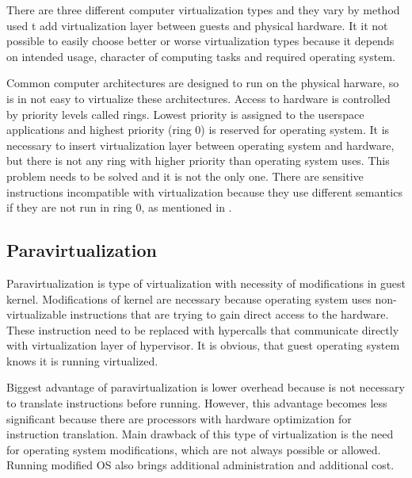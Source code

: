 
There are three different computer virtualization types and they vary by method used t
add virtualization layer between guests and physical hardware. It it not possible to easily choose better or worse virtualization types because it depends on intended usage, character of computing tasks and required operating system.
 
Common computer architectures are designed to run on the physical harware, so is in not easy to virtualize these architectures. Access to hardware is controlled by priority levels called rings. Lowest priority is assigned to the userspace applications and highest priority (ring 0) is reserved for operating system. It is necessary to insert virtualization layer between operating system and hardware, but there is not any ring with higher priority than operating system uses. This problem needs to be solved and it is not the only one. There are sensitive instructions incompatible with virtualization because they use different semantics if they are not run in ring 0, as mentioned in \cite{vmware-para}.

\subsection{Paravirtualization}
Paravirtualization is type of virtualization with necessity of modifications in guest kernel. Modifications of kernel are necessary because operating system uses non-virtualizable instructions that are trying to gain direct access to the hardware. These instruction need to be replaced with hypercalls that communicate directly with virtualization layer of hypervisor. \cite{vmware-para} It is obvious, that guest operating system knows it is running virtualized. 

Biggest advantage of paravirtualization is lower overhead because is not necessary to translate instructions before running. However, this advantage becomes less significant because there are processors with hardware optimization for instruction translation. Main drawback of this type of virtualization is the need for operating system modifications, which are not always possible or allowed. Running modified \Ac{OS} also brings additional administration and additional cost.

